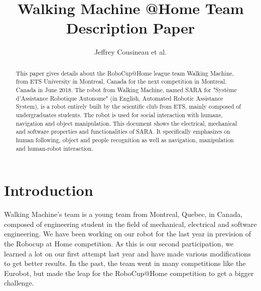 \documentclass[runningheads,a4paper]{llncs}
\begin{document}
\title{Walking Machine @Home \newline {} Team Description Paper}

\author{Jeffrey Cousineau et al.}
\maketitle



\begin{abstract}

This paper gives details about the RoboCup@Home league team Walking Machine, from ETS University in Montreal, Canada for the next competition in Montreal, Canada in June 2018. The robot from Walking Machine, named SARA for "Système d’Assistance Robotique Autonome" (in English, Automated Robotic Assistance System), is a robot entirely built by the scientific club from ETS, mainly composed of undergraduates students. The robot is used for social interaction with humans, navigation and object manipulation. This document shows the electrical, mechanical and software properties and functionalities of SARA. It specifically emphasizes on human following, object and people recognition as well as navigation, manipulation and human-robot interaction.

\end{abstract}


\section{Introduction}
\tab Walking Machine’s team is a young team from Montreal, Quebec, in Canada, composed of engineering student in the field of mechanical, electrical and software engineering. We have been working on our robot for the last year in prevision of the Robocup at Home competition. As this is our second participation, we learned a lot on our first attempt last year and have made various modifications to get better results. In the past, the team went in many competitions like the Eurobot, but made the leap for the RoboCup@Home competition to get a bigger challenge. \\
\end{document}
